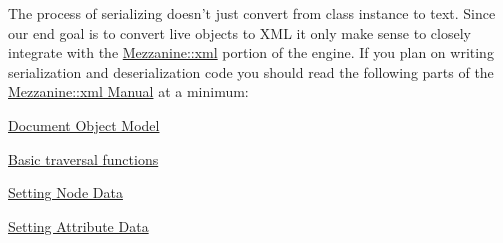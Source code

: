 The process of serializing doesn't just convert from class instance to text. Since our end goal is to convert live objects to XML it only make sense to closely integrate with the \hyperlink{namespaceMezzanine_1_1xml}{Mezzanine::xml} portion of the engine. If you plan on writing serialization and deserialization code you should read the following parts of the \hyperlink{XMLManual}{Mezzanine::xml Manual} at a minimum:
\begin{DoxyItemize}
\item \hyperlink{XMLManual_XMLDOM}{Document Object Model}
\item \hyperlink{XMLManual_XMLAccessingBasics}{Basic traversal functions}
\item \hyperlink{XMLManual_XMLModifyingNodeData}{Setting Node Data}
\item \hyperlink{XMLManual_XMLModifyingAttributeData}{Setting Attribute Data}
\end{DoxyItemize}

